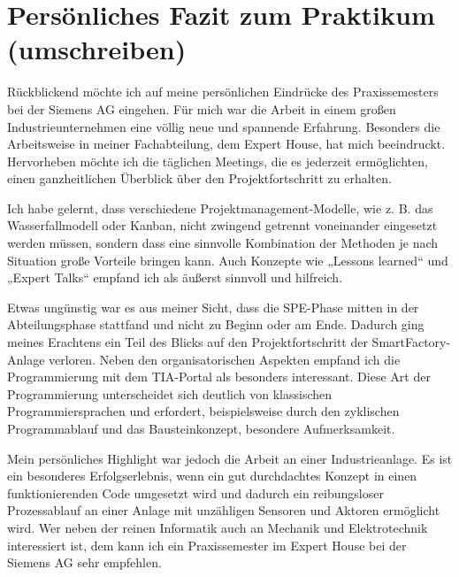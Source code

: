 \chapter{Persönliches Fazit zum Praktikum (umschreiben)}

Rückblickend möchte ich auf meine persönlichen Eindrücke des Praxissemesters bei der Siemens AG eingehen. Für mich war die Arbeit in einem großen 
Industrieunternehmen eine völlig neue und spannende Erfahrung. Besonders die Arbeitsweise in meiner Fachabteilung, dem Expert House, hat mich beeindruckt. 
Hervorheben möchte ich die täglichen Meetings, die es jederzeit ermöglichten, einen ganzheitlichen Überblick über den Projektfortschritt zu erhalten.

Ich habe gelernt, dass verschiedene Projektmanagement-Modelle, wie z. B. das Wasserfallmodell oder Kanban, nicht zwingend getrennt voneinander eingesetzt werden 
müssen, sondern dass eine sinnvolle Kombination der Methoden je nach Situation große Vorteile bringen kann. Auch Konzepte wie „Lessons learned“ und „Expert Talks“
empfand ich als äußerst sinnvoll und hilfreich.

Etwas ungünstig war es aus meiner Sicht, dass die SPE-Phase mitten in der Abteilungsphase stattfand und nicht zu Beginn oder am Ende. Dadurch ging meines 
Erachtens ein Teil des Blicks auf den Projektfortschritt der SmartFactory-Anlage verloren. Neben den organisatorischen Aspekten empfand ich die Programmierung mit
dem TIA-Portal als besonders interessant. Diese Art der Programmierung unterscheidet sich deutlich von klassischen Programmiersprachen und erfordert, 
beispielsweise durch den zyklischen Programmablauf und das Bausteinkonzept, besondere Aufmerksamkeit.

Mein persönliches Highlight war jedoch die Arbeit an einer Industrieanlage. Es ist ein besonderes Erfolgserlebnis, wenn ein gut durchdachtes Konzept in einen 
funktionierenden Code umgesetzt wird und dadurch ein reibungsloser Prozessablauf an einer Anlage mit unzähligen Sensoren und Aktoren ermöglicht wird. Wer neben
der reinen Informatik auch an Mechanik und Elektrotechnik interessiert ist, dem kann ich ein Praxissemester im Expert House bei der Siemens AG sehr empfehlen.
